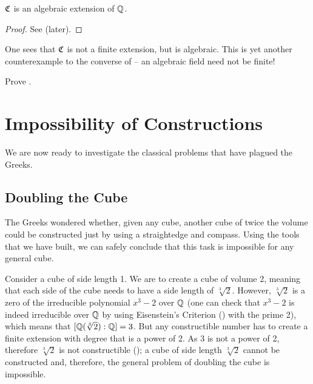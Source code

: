 \begin{corollary}\label{corollary-field-of-all-constructible-numbers-is-algebraic-extension}
    $\mathfrak{C}$ is an algebraic extension of $\mathbb{Q}$.
\end{corollary}
\begin{proof}
    See  (later).
\end{proof}

One sees that $\mathfrak{C}$ is not a finite extension, but is algebraic. This is yet another counterexample to the converse of  -- an algebraic field need not be finite!

\begin{exercise}\label{exercise-field-of-all-constructible-numbers-is-algebraic-extension}
    Prove .
\end{exercise}

\section{Impossibility of Constructions}
We are now ready to investigate the classical problems that have plagued the Greeks.

\subsection{Doubling the Cube}
The Greeks wondered whether, given any cube, another cube of twice the volume could be constructed just by using a straightedge and compass. Using the tools that we have built, we can safely conclude that this task is impossible for any general cube.

Consider a cube of side length 1. We are to create a cube of volume 2, meaning that each side of the cube needs to have a side length of $\sqrt[3]2$. However, $\sqrt[3]2$ is a zero of the irreducible polynomial $x^3 - 2$ over $\mathbb{Q}$ (one can check that $x^3-2$ is indeed irreducible over $\mathbb{Q}$ by using Eisenstein's Criterion () with the prime 2), which means that $[\mathbb{Q}(\sqrt[3]2):\mathbb{Q}] = 3$. But any constructible number has to create a finite extension with degree that is a power of 2. As 3 is not a power of 2, therefore $\sqrt[3]2$ is not constructible (); a cube of side length $\sqrt[3]2$ cannot be constructed and, therefore, the general problem of doubling the cube is impossible.

